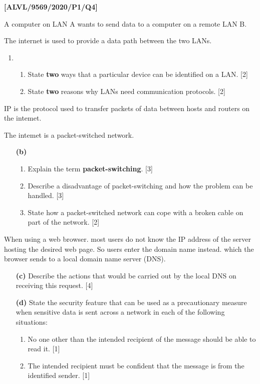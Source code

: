 \item \textbf{{[}ALVL/9569/2020/P1/Q4{]} }

A computer on LAN A wants to send data to a computer on a remote LAN
B. 

The internet is used to provide a data path between the two LANs. 
\begin{enumerate}
\item {}
\begin{enumerate}
\item State \textbf{two} ways that a particular device can be identified
on a LAN. \hfill{}{[}2{]}
\item State \textbf{two} reasons why LANs need communication protocols.
\hfill{}{[}2{]}
\end{enumerate}
\end{enumerate}
IP is the protocol used to transfer packets of data between hosts
and routers on the intemet. 

The intemet is a packet-switched network. 
\begin{enumerate}
\item[\textbf{(b)}] {}
\begin{enumerate}
\item Explain the term \textbf{packet-switching}. \hfill{}{[}3{]}
\item Describe a disadvantage of packet-switching and how the problem can
be handled. \hfill{}{[}3{]}
\item State how a packet-switched network can cope with a broken cable on
part of the network. \hfill{}{[}2{]}
\end{enumerate}
\end{enumerate}
When using a web browser. most users do not know the IP address of
the server hosting the desired web page. So users enter the domain
name instead. which the browser sends to a local domain name server
(DNS). 
\begin{enumerate}
\item[\textbf{(c)}] Describe the actions that would be carried out by the local DNS on
receiving this request.\hfill{} {[}4{]}
\item[\textbf{(d)}] State the security feature that can be used as a precautionary measure
when sensitive data is sent across a network in each of the following
situations: 
\begin{enumerate}
\item No one other than the intended recipient of the message should be
able to read it.\hfill{} {[}1{]}
\item The intended recipient must be confident that the message is from
the identified sender. \hfill{}{[}1{]}
\end{enumerate}
\end{enumerate}